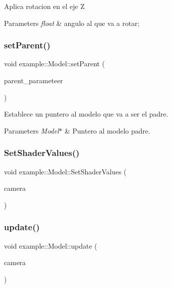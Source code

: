 Aplica rotacion en el eje Z 
\begin{DoxyParams}{Parameters}
{\em float} & angulo al que va a rotar; \\
\hline
\end{DoxyParams}
\mbox{\label{classexample_1_1_model_a8f0a3fb42ec65006716f185390a27d74}} 
\subsubsection{setParent()}
{\footnotesize\ttfamily void example\+::\+Model\+::set\+Parent (\begin{DoxyParamCaption}\item[{\textbf{ Model} \&}]{parent\+\_\+parameteer }\end{DoxyParamCaption})\hspace{0.3cm}{\ttfamily [inline]}}

Establece un puntero al modelo que va a ser el padre. 
\begin{DoxyParams}{Parameters}
{\em Model$\ast$} & Puntero al modelo padre. \\
\hline
\end{DoxyParams}
\mbox{\label{classexample_1_1_model_add60614234261cd0d73e59ffa557bf53}} 
\subsubsection{SetShaderValues()}
{\footnotesize\ttfamily void example\+::\+Model\+::\+Set\+Shader\+Values (\begin{DoxyParamCaption}\item[{const \textbf{ Camera} \&}]{camera }\end{DoxyParamCaption})\hspace{0.3cm}{\ttfamily [inline]}}

\mbox{\label{classexample_1_1_model_a1abb2f70baaf3ae10bb804802d42c413}} 
\subsubsection{update()}
{\footnotesize\ttfamily void example\+::\+Model\+::update (\begin{DoxyParamCaption}\item[{const \textbf{ Camera} \&}]{camera }\end{DoxyParamCaption})\hspace{0.3cm}{\ttfamily [inline]}}



